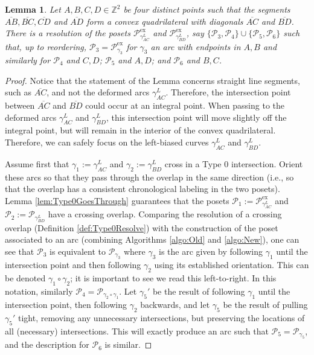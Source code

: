 \documentclass[12pt, letterpaper,table]{amsart}
\newtheorem{lemma}[theorem]{Lemma}
\theoremstyle{remark}
\newcommand{\calP}{\mathcal{P}}
\newcommand{\exx}{\mathrm{ex}}
\begin{document}
\begin{lemma}\label{lem:ResolutionGoesThrough}
Let $A,B,C,D \in \mathbb{Z}^2$ be four distinct points such that the segments $\overline{AB},\overline{BC},\overline{CD}$ and $\overline{AD}$ form a convex quadrilateral with diagonals $\overline{AC}$ and $\overline{BD}$. There is a resolution of the posets $\calP^\exx_{\gamma_{AC}^{L}}$ and $\calP^\exx_{\gamma_{BD}^{L}}$, say $\{\calP_3, \calP_4\} \cup \{\calP_5, \calP_6\}$ such that, up to reordering, $\calP_3 = \calP^\exx_{\gamma_3}$ for $\gamma_3$ an arc with endpoints in $A,B$ and similarly for $\calP_4$ and $C,D$; $\calP_5$ and $A,D$; and $\calP_6$ and $B,C$. 
\end{lemma}

\begin{proof}
Notice that the statement of the Lemma concerns straight line segments, such as $\overline{AC}$, and not the deformed arcs $\gamma_{AC}^{L}$. Therefore, the intersection point between $\overline{AC}$ and $\overline{BD}$ could occur at an integral point. When passing to the deformed arcs $\gamma_{AC}^{L}$ and $\gamma_{BD}^{L}$, this intersection point will move slightly off the integral point, but will remain in the  interior of the convex quadrilateral. Therefore, we can safely focus on the left-biased curves $\gamma_{AC}^L$ and $\gamma_{BD}^L$.

Assume first that  $\gamma_1:=\gamma_{AC}^{L}$ and $\gamma_2:=\gamma_{BD}^{L}$ cross in a Type 0 intersection. Orient these arcs so that they pass through the overlap in the same direction (i.e., so that the overlap has a consistent chronological labeling in the two posets).  Lemma \ref{lem:Type0GoesThrough} guarantees that the posets $\calP_1:=\calP^\exx_{\gamma_{AC}^{L}}$ and $\calP_2:=\calP_{\gamma_{BD}^{L}}$ have a crossing overlap. Comparing the resolution of a crossing overlap (Definition \ref{def:Type0Resolve}) with the construction of the poset associated to an arc (combining Algorithms \ref{algo:Old} and \ref{algo:New}), one can see that $\calP_3$ is equivalent to $\calP_{\gamma_3}$ where $\gamma_3$ is the arc given by following $\gamma_1$ until the intersection point and then following $\gamma_2$ using its established orientation. This can be denoted $\gamma_1 \circ \gamma_2$; it is important to see we read this left-to-right. In this notation, similarly $\calP_4 = \calP_{\gamma_2 \circ \gamma_1}$. Let $\gamma_5'$ be the result of following $\gamma_1$ until the intersection point, then following $\gamma_2$ backwards, and let $\gamma_5$ be the result of pulling $\gamma_5'$ tight, removing any unnecessary intersections, but preserving the locations of all (necessary) intersections. This will exactly produce an arc such that $\calP_5 = \calP_{\gamma_5}$, and the description for $\calP_6$ is similar. 


\end{proof}
\end{document}
